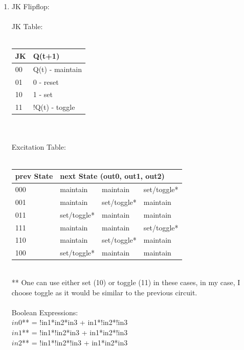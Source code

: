 \documentclass[letterpaper]{article} %
\begin{document}
\begin{enumerate}
\begin{enumerate}
    \item JK Flipflop: \\ \\
      JK Table: \\ \\
      \begin{tabular}{|l|l|}
        \hline
        JK & Q(t+1)          \\
        \hline
        00 & Q(t) - maintain \\
        01 & 0 - reset       \\
        10 & 1 - set         \\
        11 & !Q(t) - toggle \\
        \hline
      \end{tabular} \\ \\

      Excitation Table: \\ \\
      \begin{tabular}{|l|lll|}
        \hline
        prev State & \multicolumn{3}{|l|}{next State (out0, out1, out2)}       \\
        \hline
        000        & maintain   & maintain   & set/toggle* \\
        001        & maintain   & set/toggle* & maintain   \\
        011        & set/toggle* & maintain   & maintain   \\
        111        & maintain   & maintain   & set/toggle* \\
        110        & maintain   & set/toggle* & maintain   \\
        100        & set/toggle* & maintain   & maintain  \\
        \hline
      \end{tabular} \\
      ** One can use either set (10) or toggle (11) in these cases, in my case, I choose toggle as it would be similar to the previous circuit.  \\ \\
      Boolean Expressions: \\
      $in0$** =  !in1*in2*in3 + in1*!in2*!in3 \\
      $in1$** = !in1*!in2*in3 + in1*in2*!in3 \\
      $in2$**  = !in1*!in2*!in3 + in1*in2*in3 \\ \\


\end{enumerate}
\end{enumerate}
\end{document}
